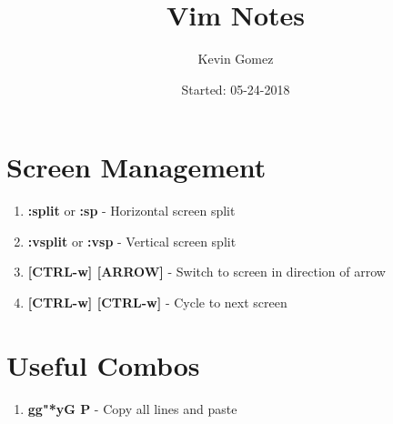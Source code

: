 \documentclass{article}
\title{Vim Notes}
\date{Started: 05-24-2018}
\author{Kevin Gomez}
\begin{document}
	
	\maketitle
	\newpage
	
	\section{Screen Management}
		\begin{enumerate}
			\item \textbf{:split} or \textbf{:sp} - Horizontal screen split
			\item \textbf{:vsplit} or \textbf{:vsp} - Vertical screen split
			\item \textbf{[CTRL-w] [ARROW]} - Switch to screen in direction of arrow
			\item \textbf{[CTRL-w] [CTRL-w]} - Cycle to next screen
	\end{enumerate}

	\section{Useful Combos}
\begin{enumerate}
	\item \textbf{gg"*yG P} - Copy all lines and paste
\end{enumerate}
\end{document}

